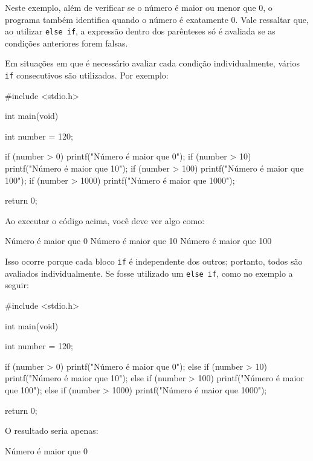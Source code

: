Neste exemplo, além de verificar se o número é maior ou menor que \(0\), o 
programa também identifica quando o número é exatamente \(0\). Vale 
ressaltar que, ao utilizar \texttt{else if}, a expressão dentro dos 
parênteses só é avaliada se as condições anteriores forem falsas.

Em situações em que é necessário avaliar cada condição individualmente, 
vários \texttt{if} consecutivos são utilizados. Por exemplo:

\begin{excode}
    #include <stdio.h>

    int main(void)
    {
        int number = 120;

        if (number > 0) {
            printf("Número é maior que 0\n");
        }
        if (number > 10) {
            printf("Número é maior que 10\n");
        }
        if (number > 100) {
            printf("Número é maior que 100\n");
        }
        if (number > 1000) {
            printf("Número é maior que 1000\n");
        }

        return 0;
    }
\end{excode}

Ao executar o código acima, você deve ver algo como:

\begin{textbox}
    Número é maior que 0
    Número é maior que 10
    Número é maior que 100
\end{textbox}

Isso ocorre porque cada bloco \texttt{if} é independente dos outros; portanto, 
todos são avaliados individualmente. Se fosse utilizado um \texttt{else if}, como 
no exemplo a seguir:

\begin{excode}
    #include <stdio.h>

    int main(void)
    {
        int number = 120;

        if (number > 0) {
            printf("Número é maior que 0\n");
        } else if (number > 10) {
            printf("Número é maior que 10\n");
        } else if (number > 100) {
            printf("Número é maior que 100\n");
        } else if (number > 1000) {
            printf("Número é maior que 1000\n");
        }

        return 0;
    }
\end{excode}

O resultado seria apenas:

\begin{textbox}
    Número é maior que 0
\end{textbox}

